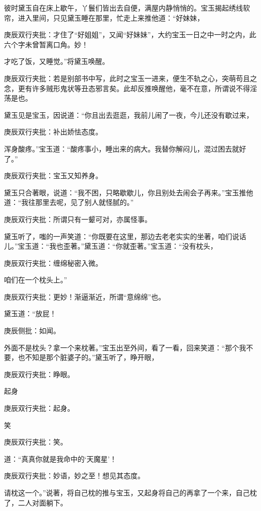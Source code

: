 \begin{parag}


    彼时黛玉自在床上歇午，丫鬟们皆出去自便，满屋内静悄悄的。宝玉揭起绣线软帘，进入里间，只见黛玉睡在那里，忙走上来推他道：“好妹妹，\begin{note}庚辰双行夹批：才住了“好姐姐”，又闻“好妹妹”，大约宝玉一日之中一时之内，此六个字未曾暂离口角。妙！\end{note}才吃了饭，又睡觉。”将黛玉唤醒。\begin{note}庚辰双行夹批：若是别部书中写，此时之宝玉一进来，便生不轨之心，突萌苟且之念，更有许多贼形鬼状等丑态邪言矣。此却反推唤醒他，毫不在意，所谓说不得淫荡是也。\end{note}黛玉见是宝玉，因说道：“你且出去逛逛，我前儿闹了一夜，今儿还没有歇过来，\begin{note}庚辰双行夹批：补出娇怯态度。\end{note}浑身酸疼。”宝玉道：“酸疼事小，睡出来的病大。我替你解闷儿，混过困去就好了。”\begin{note}庚辰双行夹批：宝玉又知养身。\end{note}黛玉只合著眼，说道：“我不困，只略歇歇儿，你且别处去闹会子再来。”宝玉推他道：“我往那里去呢，见了别人就怪腻的。”\begin{note}庚辰双行夹批：所谓只有一颦可对，亦属怪事。\end{note}
\end{parag}


\begin{parag}


    黛玉听了，嗤的一声笑道：“你既要在这里，那边去老老实实的坐著，咱们说话儿。”宝玉道：“我也歪著。”黛玉道：“你就歪著。”宝玉道：“没有枕头，\begin{note}庚辰双行夹批：缠绵秘密入微。\end{note}咱们在一个枕头上。”\begin{note}庚辰双行夹批：更妙！渐逼渐近，所谓“意绵绵”也。\end{note}黛玉道：“放屁！\begin{note}庚辰侧批：如闻。\end{note}外面不是枕头？拿一个来枕著。”宝玉出至外间，看了一看，回来笑道：“那个我不要，也不知是那个脏婆子的。”黛玉听了，睁开眼，\begin{note}庚辰双行夹批：睁眼。\end{note}起身\begin{note}庚辰双行夹批：起身。\end{note}笑\begin{note}庚辰双行夹批：笑。\end{note}道：“真真你就是我命中的‘天魔星’！\begin{note}庚辰双行夹批：妙语，妙之至！想见其态度。\end{note}请枕这一个。”说著，将自己枕的推与宝玉，又起身将自己的再拿了一个来，自己枕了，二人对面躺下。
\end{parag}


